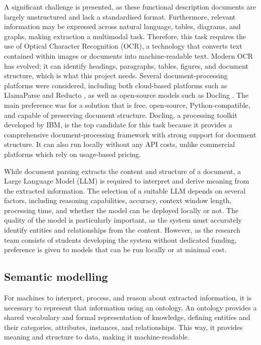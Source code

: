 \documentclass{article}
\begin{document}
A significant challenge is presented, as these functional description documents are largely unstructured and lack a standardised format. Furthermore, relevant information may be expressed across natural language, tables, diagrams, and graphs, making extraction a multimodal task. Therefore, this task requires the use of Optical Character Recognition (OCR), a technology that converts text contained within images or documents into machine-readable text. Modern OCR has evolved; it can identify headings, paragraphs, tables, figures, and document structure, which is what this project needs. Several document-processing platforms were considered, including both cloud-based platforms such as LlamaParse \parencite{llamaparse} and Reducto \parencite{reducto}, as well as open-source models such as Docling \parencite{docling}. The main preference was for a solution that is free, open-source, Python-compatible, and capable of preserving document structure. Docling, a processing toolkit developed by IBM, is the top candidate for this task because it provides a comprehensive document-processing framework with strong support for document structure. It can also run locally without any API costs, unlike commercial platforms which rely on usage-based pricing.

While document parsing extracts the content and structure of a document, a Large Language Model (LLM) is required to interpret and derive meaning from the extracted information. The selection of a suitable LLM depends on several factors, including reasoning capabilities, accuracy, context window length, processing time, and whether the model can be deployed locally or not. The quality of the model is particularly important, as the system must accurately identify entities and relationships from the content. However, as the research team consists of students developing the system without dedicated funding, preference is given to models that can be run locally or at minimal cost. 

\subsection{Semantic modelling}

For machines to interpret, process, and reason about extracted information, it is necessary to represent that information using an ontology. An ontology provides a shared vocabulary and formal representation of knowledge, defining entities and their categories, attributes, instances, and relationships. This way, it provides meaning and structure to data, making it machine-readable.
\end{document}
